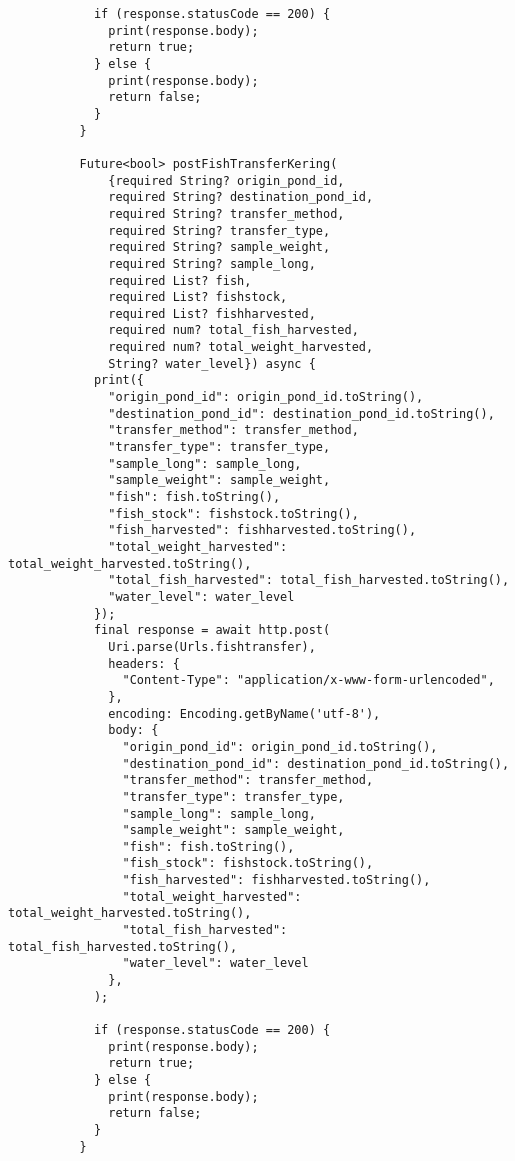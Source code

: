 \begin{lstlisting}
            if (response.statusCode == 200) {
              print(response.body);
              return true;
            } else {
              print(response.body);
              return false;
            }
          }
        
          Future<bool> postFishTransferKering(
              {required String? origin_pond_id,
              required String? destination_pond_id,
              required String? transfer_method,
              required String? transfer_type,
              required String? sample_weight,
              required String? sample_long,
              required List? fish,
              required List? fishstock,
              required List? fishharvested,
              required num? total_fish_harvested,
              required num? total_weight_harvested,
              String? water_level}) async {
            print({
              "origin_pond_id": origin_pond_id.toString(),
              "destination_pond_id": destination_pond_id.toString(),
              "transfer_method": transfer_method,
              "transfer_type": transfer_type,
              "sample_long": sample_long,
              "sample_weight": sample_weight,
              "fish": fish.toString(),
              "fish_stock": fishstock.toString(),
              "fish_harvested": fishharvested.toString(),
              "total_weight_harvested": total_weight_harvested.toString(),
              "total_fish_harvested": total_fish_harvested.toString(),
              "water_level": water_level
            });
            final response = await http.post(
              Uri.parse(Urls.fishtransfer),
              headers: {
                "Content-Type": "application/x-www-form-urlencoded",
              },
              encoding: Encoding.getByName('utf-8'),
              body: {
                "origin_pond_id": origin_pond_id.toString(),
                "destination_pond_id": destination_pond_id.toString(),
                "transfer_method": transfer_method,
                "transfer_type": transfer_type,
                "sample_long": sample_long,
                "sample_weight": sample_weight,
                "fish": fish.toString(),
                "fish_stock": fishstock.toString(),
                "fish_harvested": fishharvested.toString(),
                "total_weight_harvested": total_weight_harvested.toString(),
                "total_fish_harvested": total_fish_harvested.toString(),
                "water_level": water_level
              },
            );
        
            if (response.statusCode == 200) {
              print(response.body);
              return true;
            } else {
              print(response.body);
              return false;
            }
          }
        

\end{lstlisting}

